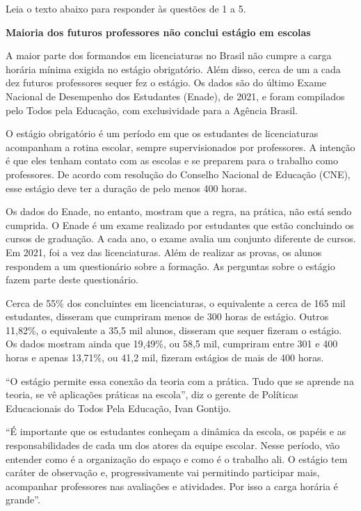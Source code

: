 

Leia o texto abaixo para responder às questões de 1 a 5.

\begin{myquote}

\textbf{Maioria dos futuros professores não conclui estágio em escolas}

A maior parte dos formandos em licenciaturas no Brasil não cumpre a carga
horária mínima exigida no estágio obrigatório. Além disso, cerca de um a cada
dez futuros professores sequer fez o estágio. Os dados são do último Exame
Nacional de Desempenho dos Estudantes (Enade), de 2021, e foram compilados
pelo Todos pela Educação, com exclusividade para a Agência Brasil.

O estágio obrigatório é um período em que os estudantes de licenciaturas
acompanham a rotina escolar, sempre supervisionados por professores. A
intenção é que eles tenham contato com as escolas e se preparem para o
trabalho como professores. De acordo com resolução do Conselho Nacional de
Educação (CNE), esse estágio deve ter a duração de pelo menos 400 horas.

Os dados do Enade, no entanto, mostram que a regra, na prática, não está sendo
cumprida. O Enade é um exame realizado por estudantes que estão concluindo os
cursos de graduação. A cada ano, o exame avalia um conjunto diferente de
cursos. Em 2021, foi a vez das licenciaturas. Além de realizar as provas, os
alunos respondem a um questionário sobre a formação. As perguntas sobre o
estágio fazem parte deste questionário.

Cerca de 55\% dos concluintes em licenciaturas, o equivalente a cerca de 165
mil estudantes, disseram que cumpriram menos de 300 horas de estágio. Outros
11,82\%, o equivalente a 35,5 mil alunos, disseram que sequer fizeram o
estágio. Os dados mostram ainda que 19,49\%, ou 58,5 mil, cumpriram entre 301
e 400 horas e apenas 13,71\%, ou 41,2 mil, fizeram estágios de mais de 400
horas.

``O estágio permite essa conexão da teoria com a prática. Tudo que se aprende
na teoria, se vê aplicações práticas na escola'', diz o gerente de Políticas
Educacionais do Todos Pela Educação, Ivan Gontijo.

``É importante que os estudantes conheçam a dinâmica da escola, os papéis e as
responsabilidades de cada um dos atores da equipe escolar. Nesse período, vão
entender como é a organização do espaço e como é o trabalho ali. O estágio tem
caráter de observação e, progressivamente vai permitindo participar mais,
acompanhar professores nas avaliações e atividades. Por isso a carga horária é
grande''.


\end{myquote}

